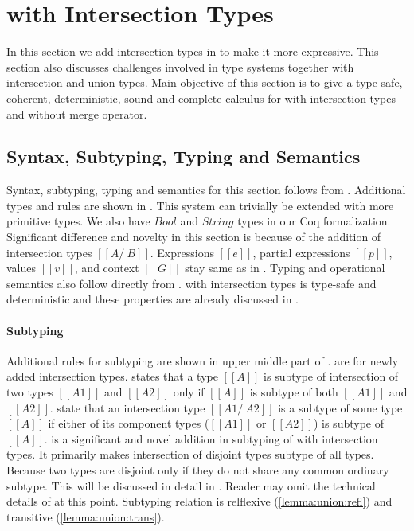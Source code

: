 \section{\cal with Intersection Types}
\label{sec:inter}
In this section we add intersection types in \cal to make it more expressive. This section also
discusses challenges involved in type systems together with intersection and union types.
Main objective of this section is to give a type safe, coherent, deterministic, sound and complete
calculus for \cal with intersection types and without merge operator.

\subsection{Syntax, Subtyping, Typing and Semantics}
\label{sec:inter:system}
Syntax, subtyping, typing and semantics for this section follows from .
Additional types and rules are shown in . This system can trivially be extended with
more primitive types. We also have $Bool$ and $String$ types in our Coq formalization.
Significant difference and novelty in this section is because of the addition of intersection types 
$[[A /\ B]]$. Expressions $[[e]]$, partial expressions $[[p]]$, values $[[v]]$, and context $[[G]]$
stay same as in .
Typing and operational semantics also follow directly from .
\cal with intersection types is type-safe and deterministic and these properties are already discussed
in .

\paragraph{Subtyping}
Additional rules for subtyping are shown in upper middle part of .
 are for newly added intersection types.  states that
a type $[[A]]$ is subtype of intersection of two types $[[A1]]$ and $[[A2]]$ only if $[[A]]$ is 
subtype of both $[[A1]]$ and $[[A2]]$.  state that an intersection type 
$[[A1 /\ A2]]$ is a subtype of some type $[[A]]$ if either of its component types ($[[A1]]$ or $[[A2]]$)
is subtype of $[[A]]$.  is a significant and novel addition in subtyping of \cal 
with intersection types. It primarily
makes intersection of disjoint types subtype of all types.
Because two types are disjoint only if they do not share any common ordinary subtype.
This will be discussed in detail in . Reader may omit
the technical details of  at this point.
Subtyping relation is relflexive (\cref{lemma:union:refl}) and transitive (\cref{lemma:union:trans}).

